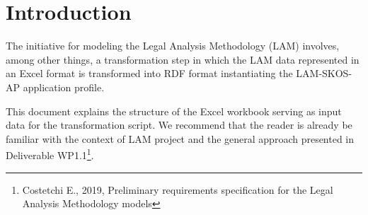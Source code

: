\section{Introduction}\label{ariaid-title1}


The initiative for modeling the Legal Analysis Methodology (LAM) involves, among other things, a transformation step in which the LAM data represented in an Excel format is transformed into RDF format instantiating the LAM-SKOS-AP application profile. 

This document explains the structure of the Excel workbook serving as input data for the transformation script. We recommend that the reader is already be familiar with the context of LAM project and the general approach presented in Deliverable WP1.1\footnote{Costetchi E., 2019, Preliminary requirements specification for the Legal Analysis Methodology models}.
